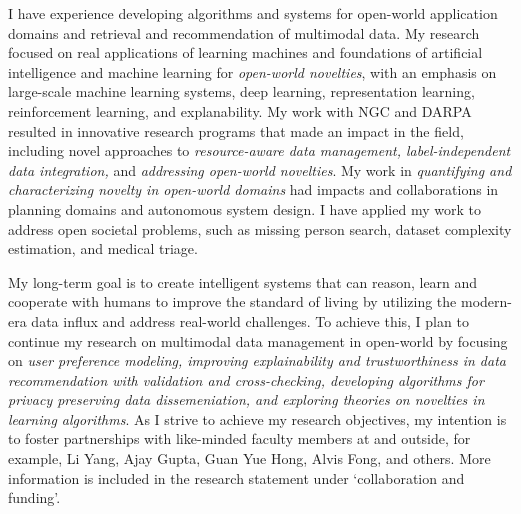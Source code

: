 \documentclass[10pt]{article}
\begin{document}
I have experience developing algorithms and systems for open-world application domains and retrieval and recommendation of multimodal data. 
My research focused on real applications of learning machines and foundations of artificial intelligence and machine learning for \textit{open-world novelties}, with an emphasis on large-scale machine learning systems, deep learning, representation learning, reinforcement learning, and explanability.
My work with NGC and DARPA resulted in innovative research programs that made an impact in the field, including novel approaches to \textit{resource-aware data management, label-independent data integration,} and \textit{addressing open-world novelties}.
My work in \textit{quantifying and characterizing novelty in open-world domains} had impacts and collaborations in planning domains and autonomous system design.
% 
I have applied my work to address open societal problems, such as missing person search, dataset complexity estimation, and medical triage.

My long-term goal is to create intelligent systems that can reason, learn and cooperate with humans to improve the standard of living by utilizing the 
modern-era data influx
and address real-world challenges.
To achieve this, I plan to continue my research on multimodal data management in open-world by focusing on \textit{user preference modeling, improving explainability and trustworthiness in data recommendation with validation and cross-checking, developing algorithms for privacy preserving data dissemeniation, and exploring theories on novelties in learning algorithms}. 
As I strive to achieve my research objectives, my intention is to foster partnerships with like-minded faculty members at \shortInstitutionName{} and outside, for example, Li Yang, Ajay Gupta, Guan Yue Hong, Alvis Fong, and others. %
%
More information is included in the research statement under `collaboration and funding'.
%
\end{document}
